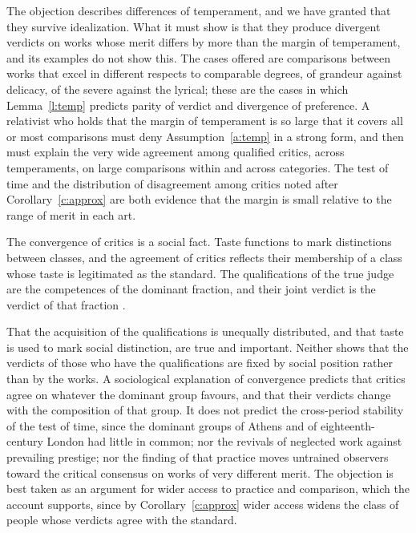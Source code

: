 \documentclass{situationist-preprint}
\begin{document}
\begin{reply}
The objection describes differences of temperament, and we have granted that they survive idealization. What it must show is that they produce divergent verdicts on works whose merit differs by more than the margin of temperament, and its examples do not show this. The cases offered are comparisons between works that excel in different respects to comparable degrees, of grandeur against delicacy, of the severe against the lyrical; these are the cases in which Lemma~\ref{l:temp} predicts parity of verdict and divergence of preference. A relativist who holds that the margin of temperament is so large that it covers all or most comparisons must deny Assumption~\ref{a:temp} in a strong form, and then must explain the very wide agreement among qualified critics, across temperaments, on large comparisons within and across categories. The test of time and the distribution of disagreement among critics noted after Corollary~\ref{c:approx} are both evidence that the margin is small relative to the range of merit in each art.
\end{reply}

\begin{objection}\label{o:bourdieu}
The convergence of critics is a social fact. Taste functions to mark distinctions between classes, and the agreement of critics reflects their membership of a class whose taste is legitimated as the standard. The qualifications of the true judge are the competences of the dominant fraction, and their joint verdict is the verdict of that fraction \citep{Bourdieu1984}.
\end{objection}

\begin{reply}
That the acquisition of the qualifications is unequally distributed, and that taste is used to mark social distinction, are true and important. Neither shows that the verdicts of those who have the qualifications are fixed by social position rather than by the works. A sociological explanation of convergence predicts that critics agree on whatever the dominant group favours, and that their verdicts change with the composition of that group. It does not predict the cross-period stability of the test of time, since the dominant groups of Athens and of eighteenth-century London had little in common; nor the revivals of neglected work against prevailing prestige; nor the finding of \citet{Meskin2013} that practice moves untrained observers toward the critical consensus on works of very different merit. The objection is best taken as an argument for wider access to practice and comparison, which the account supports, since by Corollary~\ref{c:approx} wider access widens the class of people whose verdicts agree with the standard.
\end{reply}
\end{document}
